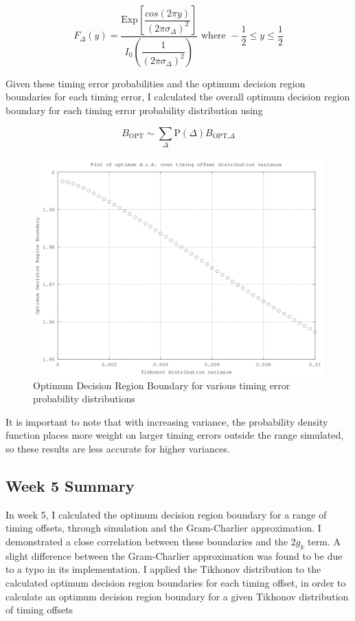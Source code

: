 \[
F_{\Delta} (y) = \frac{\text{Exp}\left [ \dfrac{cos(2 \pi y)}{(2 \pi \sigma_{\Delta})^2} \right ]}{I_0 \left ( \dfrac{1}{(2 \pi \sigma_{\Delta})^2} \right )} \text{  where  } -\frac{1}{2} \le y \le \frac{1}{2}
\]

Given these timing error probabilities and the optimum decision region
boundaries for each timing error, I calculated the overall optimum
decision region boundary for each timing error probability distribution
using

\[
B_{\text{OPT}} \sim \sum_{\Delta} \text{P}(\Delta) B_{\text{OPT,}\Delta}
\]

\begin{figure}[htbp]
\centering
\includegraphics{../plots/odrb_vs_tikhvar.png}
\caption{Optimum Decision Region Boundary for various timing error
probability distributions}
\end{figure}

It is important to note that with increasing variance, the probability
density function places more weight on larger timing errors outside the
range simulated, so these results are less accurate for higher
variances.

\subsection{Week 5 Summary}

In week 5, I calculated the optimum decision region boundary for a range
of timing offsets, through simulation and the Gram-Charlier
approximation. I demonstrated a close correlation between these
boundaries and the $2 g_k$ term. A slight difference between the
Gram-Charlier approximation was found to be due to a typo in its
implementation. I applied the Tikhonov distribution to the calculated
optimum decision region boundaries for each timing offset, in order to
calculate an optimum decision region boundary for a given Tikhonov
distribution of timing offsets

